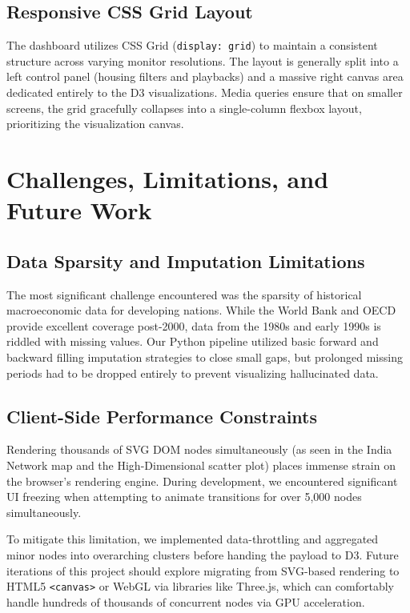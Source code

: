 \documentclass[12pt,a4paper]{article}
\begin{document}
\subsection{Responsive CSS Grid Layout}
The dashboard utilizes CSS Grid (\texttt{display: grid}) to maintain a consistent structure across varying monitor resolutions. The layout is generally split into a left control panel (housing filters and playbacks) and a massive right canvas area dedicated entirely to the D3 visualizations. Media queries ensure that on smaller screens, the grid gracefully collapses into a single-column flexbox layout, prioritizing the visualization canvas.

\newpage
\section{Challenges, Limitations, and Future Work}
\subsection{Data Sparsity and Imputation Limitations}
The most significant challenge encountered was the sparsity of historical macroeconomic data for developing nations. While the World Bank and OECD provide excellent coverage post-2000, data from the 1980s and early 1990s is riddled with missing values. Our Python pipeline utilized basic forward and backward filling imputation strategies to close small gaps, but prolonged missing periods had to be dropped entirely to prevent visualizing hallucinated data.

\subsection{Client-Side Performance Constraints}
Rendering thousands of SVG DOM nodes simultaneously (as seen in the India Network map and the High-Dimensional scatter plot) places immense strain on the browser's rendering engine. During development, we encountered significant UI freezing when attempting to animate transitions for over 5,000 nodes simultaneously. 

To mitigate this limitation, we implemented data-throttling and aggregated minor nodes into overarching clusters before handing the payload to D3. Future iterations of this project should explore migrating from SVG-based rendering to HTML5 \texttt{<canvas>} or WebGL via libraries like Three.js, which can comfortably handle hundreds of thousands of concurrent nodes via GPU acceleration.
\end{document}
